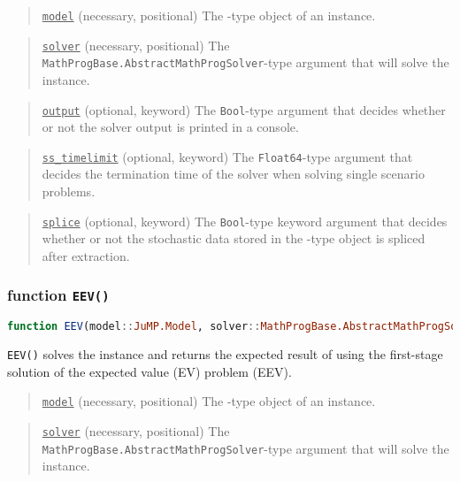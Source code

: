 \begin{quote}
	\noindent\underline{\texttt{model}} (necessary, positional) The \jumpmodel-type object of an instance.
\end{quote}

\begin{quote}
	\noindent\underline{\texttt{solver}} (necessary, positional) The \texttt{MathProgBase.AbstractMathProgSolver}-type argument that will solve the instance.
\end{quote}

\begin{quote}
	\noindent\underline{\texttt{output}} (optional, keyword) The \texttt{Bool}-type argument that decides whether or not the solver output is printed in a console.
\end{quote}

\begin{quote}
	\noindent\underline{\texttt{ss\_timelimit}} (optional, keyword) The \texttt{Float64}-type argument that decides the termination time of the solver when solving single scenario problems.
\end{quote}

\begin{quote}
	\noindent\underline{\texttt{splice}} (optional, keyword) The \texttt{Bool}-type keyword argument that decides whether or not the stochastic data stored in the \jumpmodel-type object is spliced after extraction.
\end{quote}

\subsubsection{function \texttt{EEV()}}
\begin{lstlisting}[frame=single,language=julia]
function EEV(model::JuMP.Model, solver::MathProgBase.AbstractMathProgSolver; output::Bool=false, ev_timelimit::Float64=Inf, eev_timelimit::Float64=Inf, genericnames::Bool=true)
\end{lstlisting}
\texttt{EEV()} solves the instance and returns the expected result of using the first-stage solution of the expected value (EV) problem (EEV).
\begin{quote}
	\noindent\underline{\texttt{model}} (necessary, positional) The \jumpmodel-type object of an instance.
\end{quote}

\begin{quote}
	\noindent\underline{\texttt{solver}} (necessary, positional) The \texttt{MathProgBase.AbstractMathProgSolver}-type argument that will solve the instance.
\end{quote}

